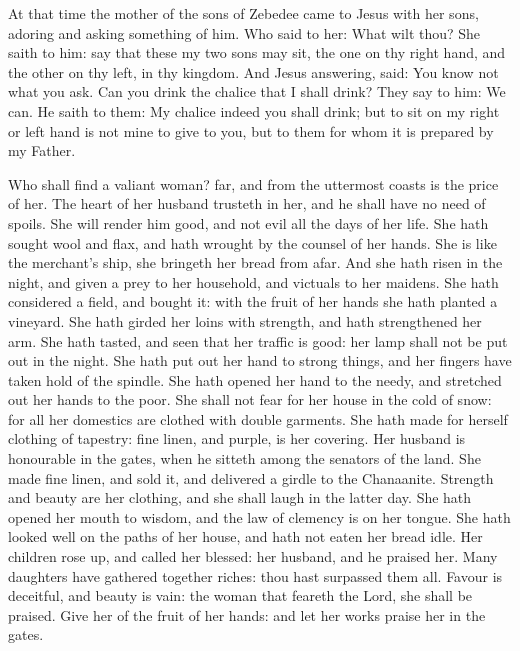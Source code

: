 \medskip


At that time the mother of the sons of Zebedee came to Jesus with her sons,
adoring and asking something of him.
Who said to her: What wilt thou? She saith to him: say that these
my two sons may sit, the one on thy right hand, and the other on thy
left, in thy kingdom.
And Jesus answering, said: You know not what you ask. Can you
drink the chalice that I shall drink? They say to him: We can.
He saith to them: My chalice indeed you shall drink; but to sit
on my right or left hand is not mine to give to you, but to them for
whom it is prepared by my Father.


\bigskip




Who shall find a valiant woman? far, and from the uttermost
coasts is the price of her.
The heart of her husband trusteth in her, and he shall have no
need of spoils.
She will render him good, and not evil all the days of her life.
She hath sought wool and flax, and hath wrought by the counsel of
her hands.
She is like the merchant's ship, she bringeth her bread from
afar.
And she hath risen in the night, and given a prey to her
household, and victuals to her maidens.
She hath considered a field, and bought it: with the fruit of her
hands she hath planted a vineyard.
She hath girded her loins with strength, and hath strengthened
her arm.
She hath tasted, and seen that her traffic is good: her lamp
shall not be put out in the night.
She hath put out her hand to strong things, and her fingers have
taken hold of the spindle.
She hath opened her hand to the needy, and stretched out her
hands to the poor.
She shall not fear for her house in the cold of snow: for all her
domestics are clothed with double garments.
She hath made for herself clothing of tapestry: fine linen, and
purple, is her covering.
Her husband is honourable in the gates, when he sitteth among the
senators of the land.
She made fine linen, and sold it, and delivered a girdle to the
Chanaanite.
Strength and beauty are her clothing, and she shall laugh in the
latter day.
She hath opened her mouth to wisdom, and the law of clemency is
on her tongue.
She hath looked well on the paths of her house, and hath not
eaten her bread idle.
Her children rose up, and called her blessed: her husband, and he
praised her.
Many daughters have gathered together riches: thou hast surpassed
them all.
Favour is deceitful, and beauty is vain: the woman that feareth
the Lord, she shall be praised.
Give her of the fruit of her hands: and let her works praise her
in the gates.

